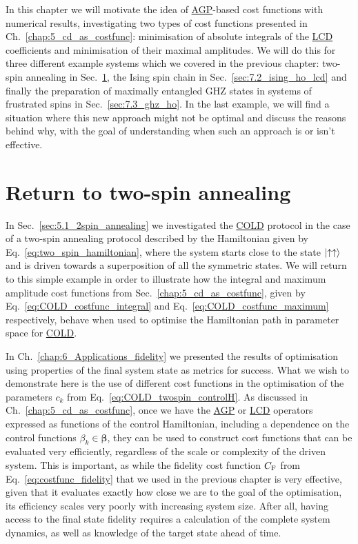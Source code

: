 \documentclass[a4paper,oneside,11pt]{book}
\newcommand{\betabb}{\boldsymbol{\beta}}
\newcommand{\acrref}[1]{\hyperref[acr:#1]{#1}}
\begin{document}
In this chapter we will motivate the idea of \acrref{AGP}-based cost functions with numerical results, investigating two types of cost functions presented in Ch.~\ref{chap:5_cd_as_costfunc}: minimisation of absolute integrals of the \acrref{LCD} coefficients and minimisation of their maximal amplitudes. We will do this for three different example systems which we covered in the previous chapter: two-spin annealing in Sec.~\ref{sec:7.1_two_spin_ho}, the Ising spin chain in Sec.~\ref{sec:7.2_ising_ho_lcd} and finally the preparation of maximally entangled GHZ states in systems of frustrated spins in Sec.~\ref{sec:7.3_ghz_ho}. In the last example, we will find a situation where this new approach might not be optimal and discuss the reasons behind why, with the goal of understanding when such an approach is or isn't effective. 

\section{Return to two-spin annealing}\label{sec:7.1_two_spin_ho}

In Sec.~\ref{sec:5.1_2spin_annealing} we investigated the \acrref{COLD} protocol in the case of a two-spin annealing protocol described by the Hamiltonian given by Eq.~\eqref{eq:two_spin_hamiltonian}, where the system starts close to the state $\ket{\uparrow\uparrow}$ and is driven towards a superposition of all the symmetric states. We will return to this simple example in order to illustrate how the integral and maximum amplitude cost functions from Sec.~\ref{chap:5_cd_as_costfunc}, given by Eq.~\eqref{eq:COLD_costfunc_integral} and Eq.~\eqref{eq:COLD_costfunc_maximum} respectively, behave when used to optimise the Hamiltonian path in parameter space for \acrref{COLD}.

In Ch.~\ref{chap:6_Applications_fidelity} we presented the results of optimisation using properties of the final system state as metrics for success. What we wish to demonstrate here is the use of different cost functions in the optimisation of the parameters $c_k$ from Eq.~\eqref{eq:COLD_twospin_controlH}. As discussed in Ch.~\ref{chap:5_cd_as_costfunc}, once we have the \acrref{AGP} or \acrref{LCD} operators expressed as functions of the control Hamiltonian, including a dependence on the control functions $\beta_k \in \betabb$, they can be used to construct cost functions that can be evaluated very efficiently, regardless of the scale or complexity of the driven system. This is important, as while the fidelity cost function $C_{\rm F}$ from Eq.~\eqref{eq:costfunc_fidelity} that we used in the previous chapter is very effective, given that it evaluates exactly how close we are to the goal of the optimisation, its efficiency scales very poorly with increasing system size. After all, having access to the final state fidelity requires a calculation of the complete system dynamics, as well as knowledge of the target state ahead of time. 
\end{document}
